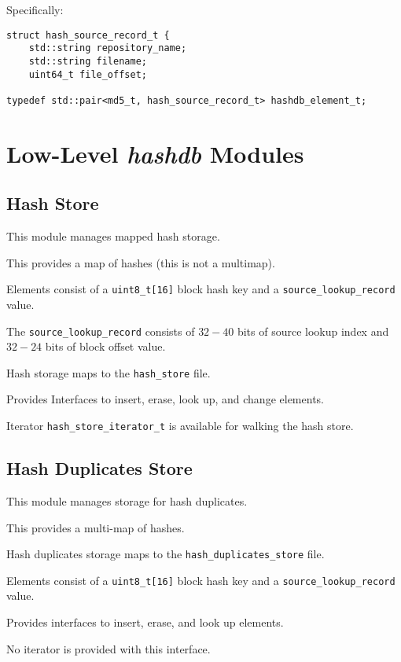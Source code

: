\documentclass[12pt,twoside]{article}
\newcommand{\hdb}{\emph{hashdb}\xspace}
\begin{document}
Specifically:
\begin{small}
\begin{verbatim}
struct hash_source_record_t {
    std::string repository_name;
    std::string filename;
    uint64_t file_offset;

typedef std::pair<md5_t, hash_source_record_t> hashdb_element_t;
\end{verbatim}
\end{small}

\section{Low-Level \hdb Modules}

\subsection{Hash Store}
This module manages mapped hash storage.
\begin{compactitem}
\item This provides a map of hashes (this is not a multimap).
\item Elements consist of a
\texttt{uint8\_t[16]} block hash key and a
\texttt{source\_lookup\_record} value.
\item The \texttt{source\_lookup\_record} consists of $32-40$ bits
of source lookup index and $32-24$ bits of block offset value.
\item Hash storage maps to the \texttt{hash\_store} file.
\item Provides Interfaces to insert, erase, look up, and change elements.
\item Iterator \texttt{hash\_store\_iterator\_t} is available
for walking the hash store.
\end{compactitem}

\subsection{Hash Duplicates Store}
This module manages storage for hash duplicates.
\begin{compactitem}
\item This provides a multi-map of hashes.
\item Hash duplicates storage maps to the \texttt{hash\_duplicates\_store} file.
\item Elements consist of a
\texttt{uint8\_t[16]} block hash key and a
\texttt{source\_lookup\_record} value.
\item Provides interfaces to insert, erase, and look up elements.
\item No iterator is provided with this interface.
\end{compactitem}
\end{document}
